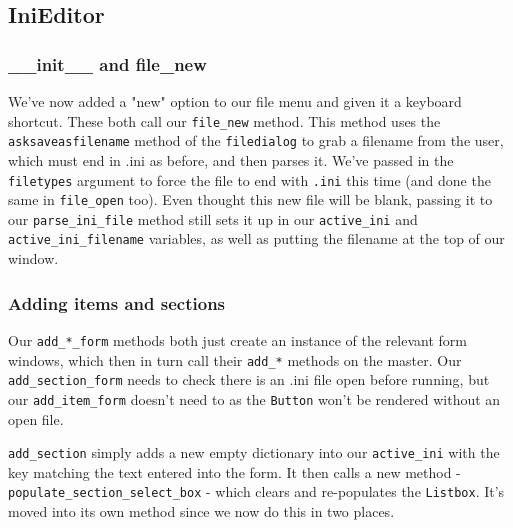 \documentclass[a4paper,11pt,openany]{book}
\begin{document}
\subsection{IniEditor}

\subsubsection{\_\_init\_\_ and file\_new}

We've now added a "new" option to our file menu and given it a keyboard shortcut. These both call our \lstinline[columns=fixed]{file_new} method. This method uses the \lstinline[columns=fixed]{asksaveasfilename} method of the \lstinline[columns=fixed]{filedialog} to grab a filename from the user, which must end in .ini as before, and then parses it. We've passed in the \lstinline[columns=fixed]{filetypes} argument to force the file to end with \lstinline[columns=fixed]{.ini} this time (and done the same in \lstinline[columns=fixed]{file_open} too). Even thought this new file will be blank, passing it to our \lstinline[columns=fixed]{parse_ini_file} method still sets it up in our \lstinline[columns=fixed]{active_ini} and \lstinline[columns=fixed]{active_ini_filename} variables, as well as putting the filename at the top of our window. 

\subsubsection{Adding items and sections}

Our \lstinline[columns=fixed]{add_*_form} methods both just create an instance of the relevant form windows, which then in turn call their \lstinline[columns=fixed]{add_*} methods on the master. Our \lstinline[columns=fixed]{add_section_form} needs to check there is an .ini file open before running, but our \lstinline[columns=fixed]{add_item_form} doesn't need to as the \lstinline[columns=fixed]{Button} won't be rendered without an open file. 

\vspace{5mm}

\lstinline[columns=fixed]{add_section} simply adds a new empty dictionary into our \lstinline[columns=fixed]{active_ini} with the key matching the text entered into the form. It then calls a new method - \lstinline[columns=fixed]{populate_section_select_box} - which clears and re-populates the \lstinline[columns=fixed]{Listbox}. It's moved into its own method since we now do this in two places.
\end{document}
